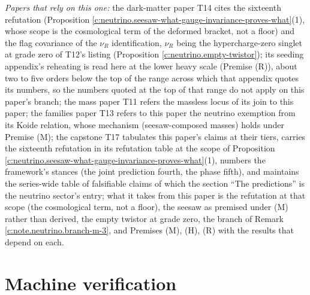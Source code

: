 \documentclass[11pt]{article}
\theoremstyle{definition}
\theoremstyle{plain}
\begin{document}
\emph{Papers that rely on this one:} the dark-matter paper T14 \cite{ButlerT14} cites the sixteenth refutation (Proposition \ref{c:neutrino.seesaw-what-gauge-invariance-proves-what}(1), whose scope is the cosmological term of the deformed bracket, not a floor) and the flag covariance of the $\nu_{R}$ identification, $\nu_{R}$ being the hypercharge-zero singlet at grade zero of T12's listing (Proposition \ref{c:neutrino.empty-twistor}); its seeding appendix's reheating is read here at the lower heavy scale (Premise (R)), about two to five orders below the top of the range across which that appendix quotes its numbers, so the numbers quoted at the top of that range do not apply on this paper's branch; the mass paper T11 \cite{ButlerT11} refers the massless locus of its join to this paper; the families paper T13 \cite{ButlerT13} refers to this paper the neutrino exemption from its Koide relation, whose mechanism (seesaw-composed masses) holds under Premise (M); the capstone T17 \cite{ButlerT17} tabulates this paper's claims at their tiers, carries the sixteenth refutation in its refutation table at the scope of Proposition \ref{c:neutrino.seesaw-what-gauge-invariance-proves-what}(1), numbers the framework's stances (the joint prediction fourth, the phase fifth), and maintains the series-wide table of falsifiable claims of which the section ``The predictions'' is the neutrino sector's entry; what it takes from this paper is the refutation at that scope (the cosmological term, not a floor), the seesaw as premised under (M) rather than derived, the empty twistor at grade zero, the branch of Remark \ref{c:note.neutrino.branch-m-3}, and Premises (M), (H), (R) with the results that depend on each.

\section{Machine verification}
\end{document}
